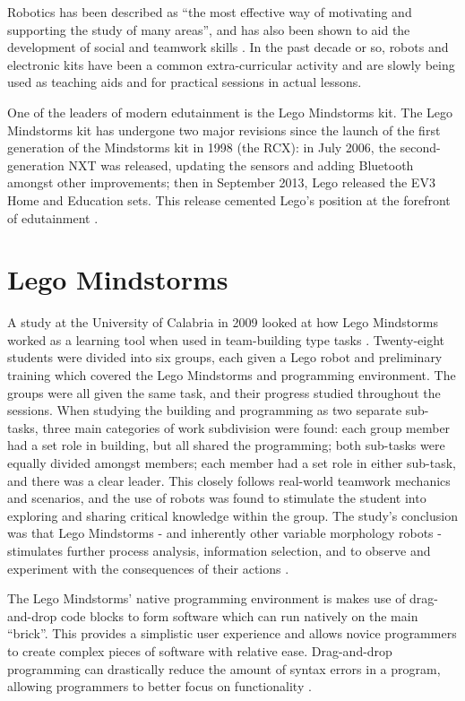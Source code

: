 \documentclass{report}
\begin{document}
    Robotics has been described as \enquote{the most effective way of motivating and supporting the study of many areas}, and has also been shown to aid the development of social and teamwork skills \cite{Johnson2003}. In the past decade or so, robots and electronic kits have been a common extra-curricular activity and are slowly being used as teaching aids and for practical sessions in actual lessons.
    
	One of the leaders of modern edutainment is the Lego Mindstorms kit. The Lego Mindstorms kit has undergone two major revisions since the launch of the first generation of the Mindstorms kit in 1998 (the RCX): in July 2006, the second-generation NXT was released, updating the sensors and adding Bluetooth amongst other improvements; then in September 2013, Lego released the EV3 Home and Education sets. This release cemented Lego's position at the forefront of edutainment \cite{Becker}.
    
    \section{Lego Mindstorms}
    A study at the University of Calabria in 2009 looked at how Lego Mindstorms worked as a learning tool when used in team-building type tasks \cite{Bilotta2009}. Twenty-eight students were divided into six groups, each given a Lego robot and preliminary training which covered the Lego Mindstorms and programming environment. The groups were all given the same task, and their progress studied throughout the sessions. When studying the building and programming as two separate sub-tasks, three main categories of work subdivision were found: each group member had a set role in building, but all shared the programming; both sub-tasks were equally divided amongst members; each member had a set role in either sub-task, and there was a clear leader. This closely follows real-world teamwork mechanics and scenarios, and the use of robots was found to stimulate the student into exploring and sharing critical knowledge within the group. The study's conclusion was that Lego Mindstorms - and inherently other variable morphology robots - stimulates further process analysis, information selection, and to observe and experiment with the consequences of their actions \cite{Bilotta2009}.
    
    The Lego Mindstorms' native programming environment is makes use of drag-and-drop code blocks to form software which can run natively on the main \enquote{brick}. This provides a simplistic user experience and allows novice programmers to create complex pieces of software with relative ease. Drag-and-drop programming can drastically reduce the amount of syntax errors in a program, allowing programmers to better focus on functionality \cite{Kelleher2002}.
\end{document}
